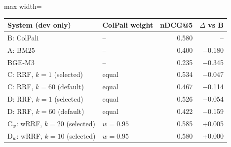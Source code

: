 \begin{adjustbox}{max width=\linewidth}
\begin{tabular}{llrr}
\toprule
System (dev only) & ColPali weight & nDCG@5 & $\Delta$ vs B \\
\midrule
B: ColPali & -- & 0.580 & -- \\
A: BM25 & -- & 0.400 & $-$0.180 \\
BGE-M3 & -- & 0.235 & $-$0.345 \\
C: RRF, $k{=}1$ (selected) & equal & 0.534 & $-$0.047 \\
C: RRF, $k{=}60$ (default) & equal & 0.467 & $-$0.114 \\
D: RRF, $k{=}1$ (selected) & equal & 0.526 & $-$0.054 \\
D: RRF, $k{=}60$ (default) & equal & 0.422 & $-$0.159 \\
C$_w$: wRRF, $k{=}20$ (selected) & $w{=}0.95$ & 0.585 & +0.005 \\
D$_w$: wRRF, $k{=}10$ (selected) & $w{=}0.95$ & 0.580 & +0.000 \\
\bottomrule
\end{tabular}
\end{adjustbox}
\par{}
